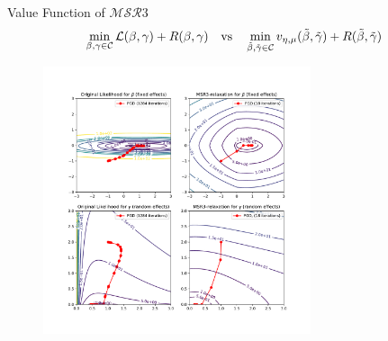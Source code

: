 \documentclass[8pt]{beamer}
\begin{document}

\begin{frame}{Value Function of $\mathcal{MSR}3$}
\[
	\min_{\beta, \gamma \in \mathcal{C}} \operatorname{\mathcal{L}}(\beta, \gamma) + R(\beta, \gamma) \quad \text{vs} \quad \min_{\tilde\beta, \tilde\gamma \in \mathcal{C}} v_{\eta,\mu}(\tilde\beta, \tilde\gamma) + R(\tilde\beta, \tilde\gamma)
\]

\begin{figure}
	\includegraphics[width=0.7\textwidth]{Figures/intuition_current.pdf}
	\label{fig:intuition_sr3}
\end{figure}
\end{frame}
\end{document}
